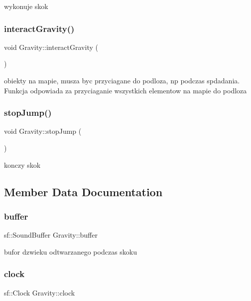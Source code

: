 wykonuje skok \mbox{\label{class_gravity_a350121b3d211c4740f3715acc64987e3}} 
\subsubsection{\texorpdfstring{interact\+Gravity()}{interactGravity()}}
{\footnotesize\ttfamily void Gravity\+::interact\+Gravity (\begin{DoxyParamCaption}{ }\end{DoxyParamCaption})}

obiekty na mapie, musza byc przyciagane do podloza, np podczas spdadania. Funkcja odpowiada za przyciaganie wszystkich elementow na mapie do podloza \mbox{\label{class_gravity_a827989f236cfa0cb2732869f352b4057}} 
\subsubsection{\texorpdfstring{stop\+Jump()}{stopJump()}}
{\footnotesize\ttfamily void Gravity\+::stop\+Jump (\begin{DoxyParamCaption}{ }\end{DoxyParamCaption})}

konczy skok 

\subsection{Member Data Documentation}
\mbox{\label{class_gravity_a3a942e2b771c8a764914cb18c8bef394}} 
\subsubsection{\texorpdfstring{buffer}{buffer}}
{\footnotesize\ttfamily sf\+::\+Sound\+Buffer Gravity\+::buffer}

bufor dzwieku odtwarzanego podczas skoku \mbox{\label{class_gravity_ac126e399cf8cc40a6267b8f099865042}} 
\subsubsection{\texorpdfstring{clock}{clock}}
{\footnotesize\ttfamily sf\+::\+Clock Gravity\+::clock\hspace{0.3cm}{\ttfamily [protected]}}

